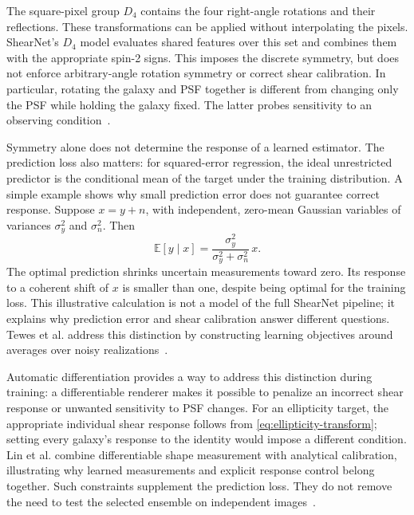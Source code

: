 The square-pixel group $D_4$ contains the four right-angle rotations and their reflections. These transformations can be applied without interpolating the pixels. ShearNet's $D_4$ model evaluates shared features over this set and combines them with the appropriate spin-2 signs. This imposes the discrete symmetry, but does not enforce arbitrary-angle rotation symmetry or correct shear calibration. In particular, rotating the galaxy and PSF together is different from changing only the PSF while holding the galaxy fixed. The latter probes sensitivity to an observing condition~\cite{cohen_group_2016,lin_dcnnanacal_2026,field_shearnet_2026}.


Symmetry alone does not determine the response of a learned estimator. The prediction loss also matters: for squared-error regression, the ideal unrestricted predictor is the conditional mean of the target under the training distribution. A simple example shows why small prediction error does not guarantee correct response. Suppose $x=y+n$, with independent, zero-mean Gaussian variables of variances $\sigma_y^2$ and $\sigma_n^2$. Then
\begin{equation}
    \mathbb{E}[y\mid x]=
    \frac{\sigma_y^2}{\sigma_y^2+\sigma_n^2}\,x.
    \label{eq:shrinkage}
\end{equation}
The optimal prediction shrinks uncertain measurements toward zero. Its response to a coherent shift of $x$ is smaller than one, despite being optimal for the training loss. This illustrative calculation is not a model of the full ShearNet pipeline; it explains why prediction error and shear calibration answer different questions. Tewes et al. address this distinction by constructing learning objectives around averages over noisy realizations~\cite{goodfellow_deep_2016,tewes_weak-lensing_2019}.

Automatic differentiation provides a way to address this distinction during training: a differentiable renderer makes it possible to penalize an incorrect shear response or unwanted sensitivity to PSF changes. For an ellipticity target, the appropriate individual shear response follows from \cref{eq:ellipticity-transform}; setting every galaxy's response to the identity would impose a different condition. Lin et al. combine differentiable shape measurement with analytical calibration, illustrating why learned measurements and explicit response control belong together. Such constraints supplement the prediction loss. They do not remove the need to test the selected ensemble on independent images~\cite{lin_dcnnanacal_2026,field_shearnet_2026}.
